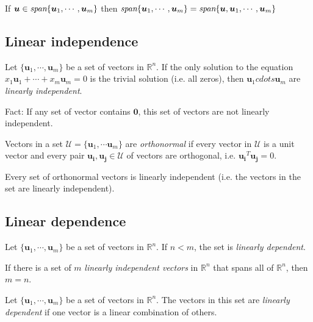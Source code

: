 \begin{theorem}
If $\bm{u}\in\emph{span}\{\bm{u}_1,\cdots,\bm{u}_m\}$ then $\emph{span}\{\bm{u}_1,\cdots,\bm{u}_m\}=\emph{span}\{\bm{u},\bm{u}_1,\cdots,\bm{u}_m\}$ 
\end{theorem}

\subsection{Linear independence}
\begin{definition}
Let $\{\bm{u}_1,\cdots,\bm{u}_m\}$ be a set of vectors in $\mathbb{R}^n$. If the only solution to the equation $x_1\bm{u}_1+\cdots+x_m\bm{u}_m=0$ is the trivial solution (i.e. all zeros), then $\bm{u}_1cdots\bm{u}_m$ are \emph{linearly independent}.
\end{definition}
Fact: If any set of vector contains $\bm{0}$, this set of vectors are not linearly independent.

\begin{definition}
Vectors in a set $\mathcal{U}=\{\bm{u}_1,\cdots\bm{u}_m\}$ are \emph{orthonormal} if every vector in $\mathcal{U}$ is a unit vector and every pair $\bm{u_i},\bm{u_j}\in\mathcal{U}$ of vectors are orthogonal, i.e. $\bm{u_i}^T\bm{u_j}=0$.
\end{definition}

\begin{theorem}
Every set of orthonormal vectors is linearly independent (i.e. the vectors in the set are linearly independent).
\end{theorem}

\subsection{Linear dependence}
\begin{theorem}
Let $\{\bm{u}_1,\cdots,\bm{u}_m\}$ be a set of vectors in $\mathbb{R}^n$. If $n<m$, the set is \emph{linearly dependent}.
\end{theorem}

\begin{corollary}
If there is a set of $m$ \emph{linearly independent vectors} in $\mathbb{R}^n$ that spans all of $\mathbb{R}^n$, then $m=n$.
\end{corollary}

\begin{theorem}
Let $\{\bm{u}_1,\cdots,\bm{u}_m\}$ be a set of vectors in $\mathbb{R}^n$. The vectors in this set are \emph{linearly dependent} if one vector is a linear combination of others.
\end{theorem}

